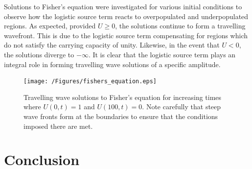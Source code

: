 \documentclass[11pt,titlepage,a4paper]{article}
\begin{document}
		Solutions to Fisher's equation were investigated for various initial conditions to observe how the logistic source term reacts to overpopulated and underpopulated regions. As expected, provided $U \ge 0$, the solutions continue to form a travelling wavefront. This is due to the logistic source term compensating for regions which do not satisfy the carrying capacity of unity. Likewise, in the event that $U < 0$, the solutions diverge to $-\infty$. It is clear that the logistic source term plays an integral role in forming travelling wave solutions of a specific amplitude.

		\begin{figure}[tbh]
			\centering
				\texttt{[image: /Figures/fishers\_equation.eps]}
			\caption{Travelling wave solutions to Fisher's equation for increasing times where $U(0, t) = 1$ and $U(100, t) = 0$. Note carefully that steep wave fronts form at the boundaries to ensure that the conditions imposed there are met.}
			\label{fig:fishers_equation_sol_pdepe}
		\end{figure}
	


\section{Conclusion}
	\label{sec:conclusion}
	
	



\clearpage
\printbibliography
\end{document}
